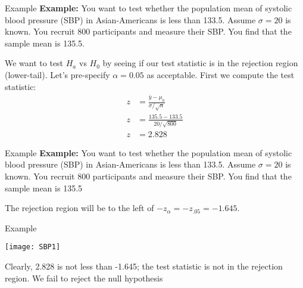 \documentclass[xcolor=dvipsnames]{beamer}
\begin{document}
\begin{frame}{Example}
	\textbf{Example:} You want to test whether the population mean of systolic blood pressure (SBP) in Asian-Americans is less than 133.5. Assume $\sigma = 20$ is known. You recruit 800 participants and measure their SBP. You find that the sample mean is 135.5. \\
	\vspace{5pt}
	
	We want to test $H_a$ vs $H_0$ by seeing if our test statistic is in the rejection region (lower-tail). Let's pre-specify $\alpha = 0.05$ as acceptable. First we compute the test statistic:
	\begin{align*}
	z &= \frac{\bar{y} - \mu_0}{\sigma / \sqrt{n}} \\
	z &= \frac{135.5 - 133.5}{20 / \sqrt{800}} \\
	z &= 2.828
	\end{align*}
\end{frame}

\begin{frame}{Example}
	\textbf{Example:} You want to test whether the population mean of systolic blood pressure (SBP) in Asian-Americans is less than 133.5. Assume $\sigma = 20$ is known. You recruit 800 participants and measure their SBP. You find that the sample mean is 135.5 \\ 
	\vspace{15pt}  
	
	The rejection region will be to the left of $-z_{\alpha} = -z_{.05} = -1.645$.
\end{frame}

\begin{frame}{Example}
	\begin{center}
		\texttt{[image: SBP1]}
	\end{center}

\vspace{-10pt}
Clearly, 2.828 is not less than -1.645; the test statistic is not in the rejection region. We fail to reject the null hypothesis
\end{frame}
\end{document}
